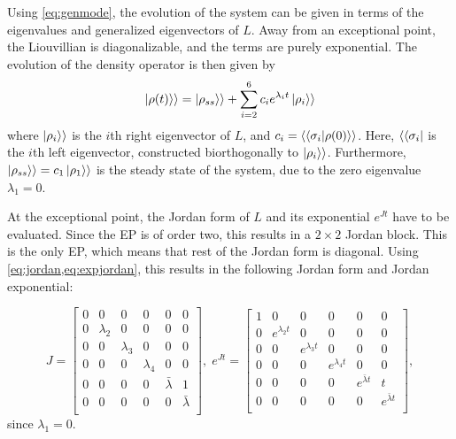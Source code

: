 \documentclass[../main.tex]{subfiles}
\begin{document}
Using \cref{eq:genmode}, the evolution of the system can be given in terms of the eigenvalues and generalized eigenvectors of $L$. Away from an exceptional point, the Liouvillian is diagonalizable, and the terms are purely exponential. The evolution of the density operator is then given by
\begin{equation}\label{eq:dynnonep}
    \ket{\rho(t)}\rangle = \ket{\rho_{ss}}\rangle + \sum_{i=2}^6 c_i e^{\lambda_i t} \ket{\rho_i}\rangle
\end{equation}
where $\ket{\rho_i}\rangle$ is the $i$th right eigenvector of $L$, and $c_i = \langle\braket{\sigma_i|\rho(0)}\rangle$. Here, $\langle\bra{\sigma_i}$ is the $i$th left eigenvector, constructed biorthogonally to $\ket{\rho_i}\rangle$. Furthermore, $\ket{\rho_{ss}}\rangle = c_1 \ket{\rho_1}\rangle$ is the steady state of the system, due to the zero eigenvalue $\lambda_1=0$.

At the exceptional point, the Jordan form of $L$ and its exponential $e^{Jt}$ have to be evaluated. Since the EP is of order two, this results in a $2\times2$ Jordan block. This is the only EP, which means that rest of the Jordan form is diagonal. Using \cref{eq:jordan,eq:expjordan}, this results in the following Jordan form and Jordan exponential:

\begin{equation}
    J = \begin{bmatrix} 0 & 0 & 0 & 0 & 0 & 0 \\
                        0 & \lambda_2 & 0 & 0 & 0 & 0 \\
                        0 & 0 & \lambda_3 & 0 & 0 & 0 \\
                        0 & 0 & 0 & \lambda_4 & 0 & 0 \\
                        0 & 0 & 0 & 0 & \bar \lambda & 1 \\
                        0 & 0 & 0 & 0 & 0 & \bar \lambda \\ \end{bmatrix}, \; 
        e^{Jt} = \begin{bmatrix} 1 & 0 & 0 & 0 & 0 & 0 \\
            0 & e^{\lambda_2t} & 0 & 0 & 0 & 0 \\
            0 & 0 & e^{\lambda_3t} & 0 & 0 & 0 \\
            0 & 0 & 0 & e^{\lambda_4t} & 0 & 0 \\
            0 & 0 & 0 & 0 & e^{\bar \lambda t} & t \\
        0 & 0 & 0 & 0 & 0 & e^{\bar \lambda t} \\ \end{bmatrix},
\end{equation}
since $\lambda_1 = 0$.
\end{document}
